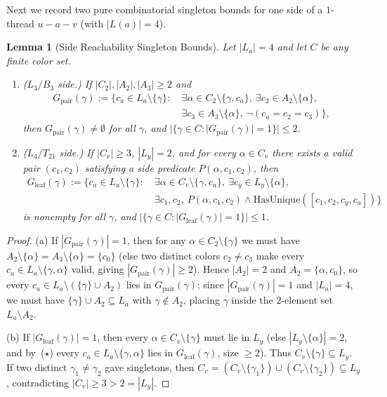\documentclass[11pt,a4paper]{article}
\newtheorem{lemma}[theorem]{Lemma}
\theoremstyle{definition}
\begin{document}
Next we record two pure combinatorial singleton bounds for one side of a $1$-thread $u - a - v$ (with $|L(a)| = 4$).

\begin{lemma}[Side Reachability Singleton Bounds]\label{lem:side-bounds}
Let $|L_a| = 4$ and let $C$ be any finite color set.
\begin{enumerate}[label=(\alph*),leftmargin=*,itemsep=2pt]
  \item \emph{($L_3/B_3$ side.)} If $|C_2|, |A_2|, |A_3| \ge 2$ and
  \[\begin{aligned}
    G_{\mathrm{pair}}(\gamma) := \bigl\{c_a \in L_a \setminus \{\gamma\} :\ & \exists \alpha \in C_2 \setminus \{\gamma, c_a\},\ \exists c_2 \in A_2 \setminus \{\alpha\},\\
    & \exists c_3 \in A_3 \setminus \{\alpha\},\ \neg(c_a = c_2 = c_3)\bigr\},
  \end{aligned}\]
  then $G_{\mathrm{pair}}(\gamma) \neq \emptyset$ for all $\gamma$, and $|\{\gamma \in C : |G_{\mathrm{pair}}(\gamma)| = 1\}| \le 2$.
  \item \emph{($L_4/T_{21}$ side.)} If $|C_v| \ge 3$, $|L_y| = 2$, and for every $\alpha \in C_v$ there exists a valid pair $(c_1, c_2)$ satisfying a side predicate $P(\alpha, c_1, c_2)$, then
  \[\begin{aligned}
    G_{\mathrm{leaf}}(\gamma) := \bigl\{c_a \in L_a \setminus \{\gamma\} :\ & \exists \alpha \in C_v \setminus \{\gamma, c_a\},\ \exists c_y \in L_y \setminus \{\alpha\},\\
    & \exists c_1, c_2,\ P(\alpha, c_1, c_2) \land \mathrm{HasUnique}([c_1, c_2, c_y, c_a])\bigr\}
  \end{aligned}\]
  is nonempty for all $\gamma$, and $|\{\gamma \in C : |G_{\mathrm{leaf}}(\gamma)| = 1\}| \le 1$.
\end{enumerate}
\end{lemma}

\begin{proof}
(a) If $|G_{\mathrm{pair}}(\gamma)| = 1$, then for any $\alpha \in C_2 \setminus \{\gamma\}$ we must have $A_2 \setminus \{\alpha\} = A_3 \setminus \{\alpha\} = \{c_0\}$ (else two distinct colors $c_2 \neq c_3$ make every $c_a \in L_a \setminus \{\gamma, \alpha\}$ valid, giving $|G_{\mathrm{pair}}(\gamma)| \ge 2$). Hence $|A_2| = 2$ and $A_2 = \{\alpha, c_0\}$, so every $c_a \in L_a \setminus (\{\gamma\} \cup A_2)$ lies in $G_{\mathrm{pair}}(\gamma)$; since $|G_{\mathrm{pair}}(\gamma)| = 1$ and $|L_a| = 4$, we must have $\{\gamma\} \cup A_2 \subseteq L_a$ with $\gamma \notin A_2$, placing $\gamma$ inside the $2$-element set $L_a \setminus A_2$.

(b) If $|G_{\mathrm{leaf}}(\gamma)| = 1$, then every $\alpha \in C_v \setminus \{\gamma\}$ must lie in $L_y$ (else $|L_y \setminus \{\alpha\}| = 2$, and by~($\star$) every $c_a \in L_a \setminus \{\gamma, \alpha\}$ lies in $G_{\mathrm{leaf}}(\gamma)$, size $\ge 2$). Thus $C_v \setminus \{\gamma\} \subseteq L_y$. If two distinct $\gamma_1 \neq \gamma_2$ gave singletons, then $C_v = (C_v \setminus \{\gamma_1\}) \cup (C_v \setminus \{\gamma_2\}) \subseteq L_y$, contradicting $|C_v| \ge 3 > 2 = |L_y|$.
\end{proof}
\end{document}
